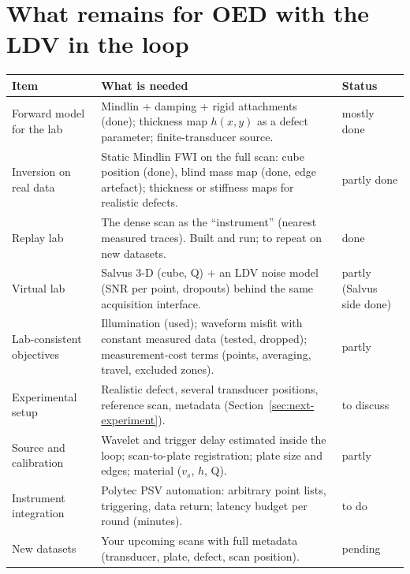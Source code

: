 \documentclass[11pt,a4paper]{article}
\begin{document}
\section{What remains for OED with the LDV in the loop}
\begin{table}[h]
\centering\small
\begin{tabularx}{\textwidth}{@{}p{3.6cm}Lp{2.2cm}@{}}
\toprule
Item & What is needed & Status \\
\midrule
Forward model for the lab & Mindlin + damping + rigid attachments (done); thickness map $h(x,y)$ as a defect parameter; finite-transducer source. & mostly done \\
Inversion on real data & Static Mindlin FWI on the full scan: cube position (done), blind mass map (done, edge artefact); thickness or stiffness maps for realistic defects. & partly done \\
Replay lab & The dense scan as the ``instrument'' (nearest measured traces). Built and run; to repeat on new datasets. & done \\
Virtual lab & Salvus 3-D (cube, Q) + an LDV noise model (SNR per point, dropouts) behind the same acquisition interface. & partly (Salvus side done) \\
Lab-consistent objectives & Illumination (used); waveform misfit with constant measured data (tested, dropped); measurement-cost terms (points, averaging, travel, excluded zones). & partly \\
Experimental setup & Realistic defect, several transducer positions, reference scan, metadata (Section~\ref{sec:next-experiment}). & to discuss \\
Source and calibration & Wavelet and trigger delay estimated inside the loop; scan-to-plate registration; plate size and edges; material ($v_s$, $h$, Q). & partly \\
Instrument integration & Polytec PSV automation: arbitrary point lists, triggering, data return; latency budget per round (minutes). & to do \\
New datasets & Your upcoming scans with full metadata (transducer, plate, defect, scan position). & pending \\
\bottomrule
\end{tabularx}
\end{table}
\end{document}
